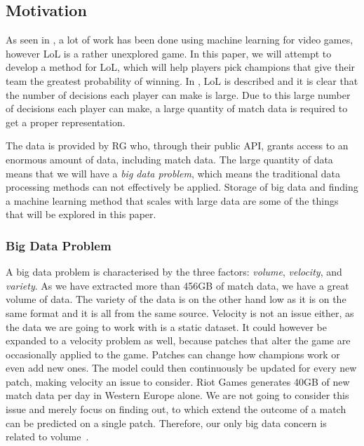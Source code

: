 \subsection{Motivation}\label{sec:motivation}
As seen in , a lot of work has been done using machine learning for video games, however LoL is a rather unexplored game. 
In this paper, we will attempt to develop a method for LoL, which will help players pick champions that give their team the greatest probability of winning. In , LoL is described and it is clear that the number of decisions each player can make is large. Due to this large number of decisions each player can make, a large quantity of match data is required to get a proper representation. 

The data is provided by RG who, through their public API, grants access to an enormous amount of data, including match data.
The large quantity of data means that we will have a \emph{big data problem}, which means the traditional data processing methods can not effectively be applied. Storage of big data and finding a machine learning method that scales with large data are some of the things that will be explored in this paper.

\subsubsection{Big Data Problem}\label{sec:big_data_problem}
A big data problem is characterised by the three factors: \emph{volume}, \emph{velocity}, and \emph{variety}. As we have extracted more than 456GB of match data, we have a great volume of data. The variety of the data is on the other hand low as it is on the same format and it is all from the same source. Velocity is not an issue either, as the data we are going to work with is a static dataset. It could however be expanded to a velocity problem as well, because patches that alter the game are occasionally applied to the game. Patches can change how champions work or even add new ones. The model could then continuously be updated for every new patch, making velocity an issue to consider. Riot Games generates 40GB of new match data per day in Western Europe alone. We are not going to consider this issue and merely focus on finding out, to which extend the outcome of a match can be predicted on a single patch. Therefore, our only big data concern is related to volume~\cite{madden2012databases}.

